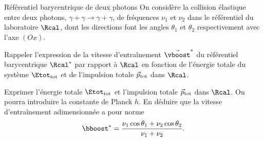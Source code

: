 \begin{exo}[PC][1][TD]{Référentiel barycentrique de deux photons}
  On considère la collision élastique entre deux photons, $\gamma + \gamma \rightarrow \gamma + \gamma$, de fréquences $\nu_1$ et $\nu_2$ dans le référentiel du laboratoire $\Rcal$, dont les directions font les angles $\theta_1$ et $\theta_2$ respectivement avec l'axe $(Ox)$.
  \begin{quest}
    \item	Rappeler l'expression de la vitesse d'entraînement $\Vec{\vboost}^*$ du référentiel barycentrique $\Rcal^{*}$ par rapport à $\Rcal$ en fonction de l'énergie totale du système $\Etot_{\rm tot}$ et de l'impulsion totale $\Vec{p}_{\rm tot}$ dans $\Rcal$.
    \item Exprimer l'énergie totale $\Etot_{\rm tot}$ et l'impulsion totale $\Vec{p}_{\rm tot}$ dans $\Rcal$. On pourra introduire la constante de Planck $h$. En déduire que la vitesse d'entraînement adimensionnée a pour norme 
    \begin{equation}
      \bboost^* = \frac{\nu_1 \cos \theta_1+\nu_2 \cos \theta_2}{\nu_1+\nu_2}.
    \end{equation}


\end{quest}
\end{exo}
